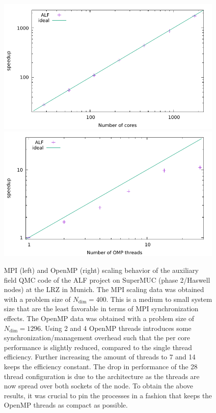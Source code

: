 \begin{figure}[H]
	\begin{center}
		\includegraphics[scale=0.6]{Figures/MPI_scaling_ALF.pdf}
		\includegraphics[scale=0.6]{Figures/OMP_scaling_ALF.pdf}
	\end{center}
	\caption{\label{fig_scaling}  MPI (left) and OpenMP (right) scaling behavior of the auxiliary field QMC code of the ALF project on SuperMUC (phase 2/Haswell nodes) at the LRZ in Munich.
		The MPI scaling data was obtained with a problem size of $N_{\text{dim}}=400$. This is a medium to small system size that are the least favorable in terms of MPI synchronization effects.
		The OpenMP data was obtained with a problem size of $N_{\text{dim}}=1296$. Using 2 and 4 OpenMP threads introduces some synchronization/management overhead such that the per core performance is slightly reduced, compared to the single thread efficiency. Further increasing the amount of threads to 7 and 14 keeps the efficiency constant. The drop in performance of the 28 thread configuration is due to the architecture as the threads are now spread over both sockets of the node. To obtain the above results, it was crucial to pin the processes in a fashion that keeps the OpenMP threads as compact as possible.}
\end{figure}

